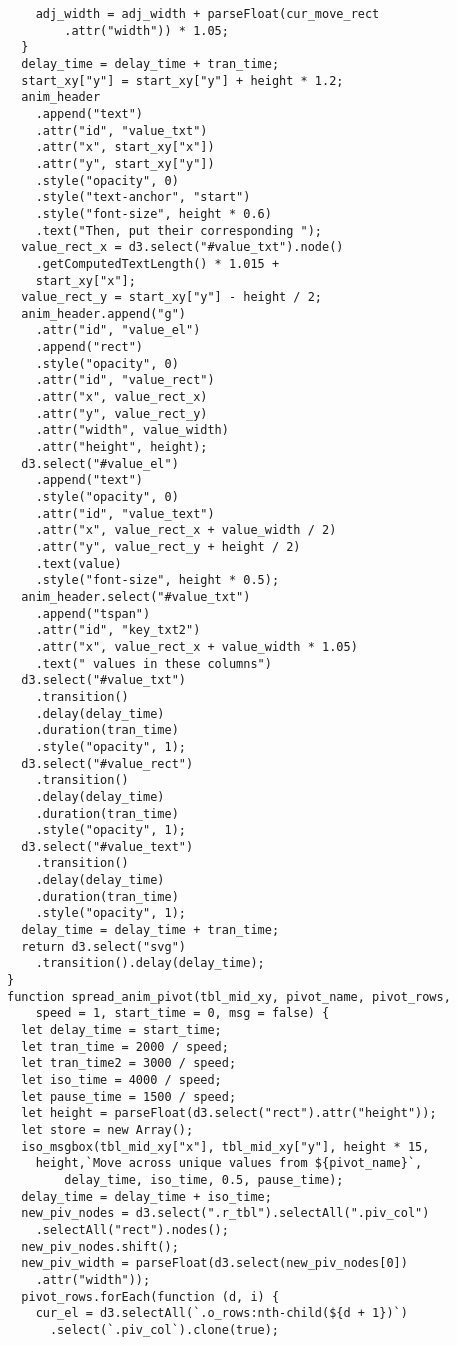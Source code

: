 \begin{lstlisting}
    adj_width = adj_width + parseFloat(cur_move_rect
        .attr("width")) * 1.05;
  }
  delay_time = delay_time + tran_time;
  start_xy["y"] = start_xy["y"] + height * 1.2;
  anim_header
    .append("text")
    .attr("id", "value_txt")
    .attr("x", start_xy["x"])
    .attr("y", start_xy["y"])
    .style("opacity", 0)
    .style("text-anchor", "start")
    .style("font-size", height * 0.6)
    .text("Then, put their corresponding ");
  value_rect_x = d3.select("#value_txt").node()
    .getComputedTextLength() * 1.015 +
    start_xy["x"];
  value_rect_y = start_xy["y"] - height / 2;
  anim_header.append("g")
    .attr("id", "value_el")
    .append("rect")
    .style("opacity", 0)
    .attr("id", "value_rect")
    .attr("x", value_rect_x)
    .attr("y", value_rect_y)
    .attr("width", value_width)
    .attr("height", height);
  d3.select("#value_el")
    .append("text")
    .style("opacity", 0)
    .attr("id", "value_text")
    .attr("x", value_rect_x + value_width / 2)
    .attr("y", value_rect_y + height / 2)
    .text(value)
    .style("font-size", height * 0.5);
  anim_header.select("#value_txt")
    .append("tspan")
    .attr("id", "key_txt2")
    .attr("x", value_rect_x + value_width * 1.05)
    .text(" values in these columns")
  d3.select("#value_txt")
    .transition()
    .delay(delay_time)
    .duration(tran_time)
    .style("opacity", 1);
  d3.select("#value_rect")
    .transition()
    .delay(delay_time)
    .duration(tran_time)
    .style("opacity", 1);
  d3.select("#value_text")
    .transition()
    .delay(delay_time)
    .duration(tran_time)
    .style("opacity", 1);
  delay_time = delay_time + tran_time;
  return d3.select("svg")
    .transition().delay(delay_time);
}
function spread_anim_pivot(tbl_mid_xy, pivot_name, pivot_rows, 
    speed = 1, start_time = 0, msg = false) {
  let delay_time = start_time;
  let tran_time = 2000 / speed;
  let tran_time2 = 3000 / speed;
  let iso_time = 4000 / speed;
  let pause_time = 1500 / speed;
  let height = parseFloat(d3.select("rect").attr("height"));
  let store = new Array();
  iso_msgbox(tbl_mid_xy["x"], tbl_mid_xy["y"], height * 15, 
    height,`Move across unique values from ${pivot_name}`, 
        delay_time, iso_time, 0.5, pause_time);
  delay_time = delay_time + iso_time;
  new_piv_nodes = d3.select(".r_tbl").selectAll(".piv_col")
    .selectAll("rect").nodes();
  new_piv_nodes.shift();
  new_piv_width = parseFloat(d3.select(new_piv_nodes[0])
    .attr("width"));
  pivot_rows.forEach(function (d, i) {
    cur_el = d3.selectAll(`.o_rows:nth-child(${d + 1})`)
      .select(`.piv_col`).clone(true);

\end{lstlisting}

